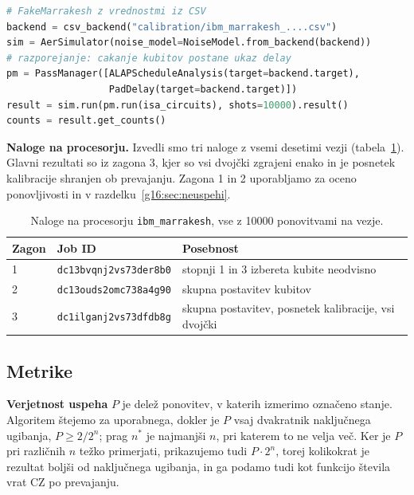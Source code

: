 \begin{lstlisting}[float=htbp, language=Python, caption={Gradnja dvojčka iz kalibracijskega CSV (skrajšano iz datoteke \texttt{grover\_ibm.py} v repozitoriju).}, label={g16:lst:dvojcek}]
# FakeMarrakesh z vrednostmi iz CSV
backend = csv_backend("calibration/ibm_marrakesh_....csv")
sim = AerSimulator(noise_model=NoiseModel.from_backend(backend))
# razporejanje: cakanje kubitov postane ukaz delay
pm = PassManager([ALAPScheduleAnalysis(target=backend.target),
                  PadDelay(target=backend.target)])
result = sim.run(pm.run(isa_circuits), shots=10000).result()
counts = result.get_counts()
\end{lstlisting}

\textbf{Naloge na procesorju.} Izvedli smo tri naloge z vsemi desetimi vezji (tabela~\ref{g16:tab:naloge}). Glavni rezultati so iz zagona 3, kjer so vsi dvojčki zgrajeni enako in je posnetek kalibracije shranjen ob prevajanju. Zagona 1 in 2 uporabljamo za oceno ponovljivosti in v razdelku~\ref{g16:sec:neuspehi}.

\begin{table}[htbp]
\caption{Naloge na procesorju \texttt{ibm\_marrakesh}, vse z \num{10000} ponovitvami na vezje.}
\label{g16:tab:naloge}
\centering
\begin{tabular}{lll}
\toprule
Zagon & Job ID & Posebnost \\
\midrule
1 & \texttt{dc13bvqnj2vs73der8b0} & stopnji 1 in 3 izbereta kubite neodvisno \\
2 & \texttt{dc13ouds2omc738a4g90} & skupna postavitev kubitov \\
3 & \texttt{dc1ilganj2vs73dfdb8g} & skupna postavitev, posnetek kalibracije, vsi dvojčki \\
\bottomrule
\end{tabular}
\end{table}

\subsection{Metrike}
\label{g16:sec:metrike}

\textbf{Verjetnost uspeha} $P$ je delež ponovitev, v katerih izmerimo označeno stanje. Algoritem štejemo za uporabnega, dokler je $P$ vsaj dvakratnik naključnega ugibanja, $P \geq 2/2^n$; prag $n^*$ je najmanjši $n$, pri katerem to ne velja več. Ker je $P$ pri različnih $n$ težko primerjati, prikazujemo tudi $P \cdot 2^n$, torej kolikokrat je rezultat boljši od naključnega ugibanja, in ga podamo tudi kot funkcijo števila vrat CZ po prevajanju.

